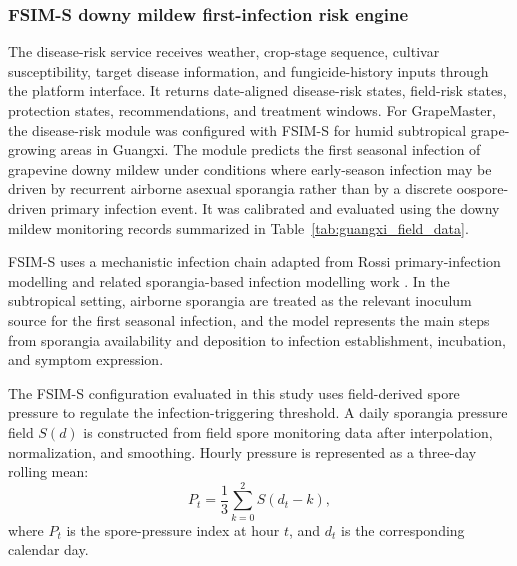 \documentclass[12pt]{article}
\begin{document}
\subsubsection{FSIM-S downy mildew first-infection risk engine}\label{fsim-s-downy-mildew-first-infection-risk-engine}

The disease-risk service receives weather, crop-stage sequence, cultivar susceptibility, target disease information, and fungicide-history inputs through the platform interface. It returns date-aligned disease-risk states, field-risk states, protection states, recommendations, and treatment windows. For GrapeMaster, the disease-risk module was configured with FSIM-S for humid subtropical grape-growing areas in Guangxi. The module predicts the first seasonal infection of grapevine downy mildew under conditions where early-season infection may be driven by recurrent airborne asexual sporangia rather than by a discrete oospore-driven primary infection event. It was calibrated and evaluated using the downy mildew monitoring records summarized in Table~\ref{tab:guangxi_field_data}.

FSIM-S uses a mechanistic infection chain adapted from Rossi primary-infection modelling and related sporangia-based infection modelling work \citep{rossiMechanisticModelSimulating2008,caffiModelPredictingPrimary2009c,caffiEvaluationDynamicModel2011,brischettoWeatherDrivenModelPredicting2021}. In the subtropical setting, airborne sporangia are treated as the relevant inoculum source for the first seasonal infection, and the model represents the main steps from sporangia availability and deposition to infection establishment, incubation, and symptom expression.

The FSIM-S configuration evaluated in this study uses field-derived spore pressure to regulate the infection-triggering threshold. A daily sporangia pressure field \(S(d)\) is constructed from field spore monitoring data after interpolation, normalization, and smoothing. Hourly pressure is represented as a three-day rolling mean:
\begin{equation}
P_{t}
=
\frac{1}{3}
\sum_{k=0}^{2} S\left(d_{t}-k\right),
\label{eq:spore_pressure}
\end{equation}
where \(P_t\) is the spore-pressure index at hour \(t\), and \(d_t\) is the corresponding calendar day.
\end{document}
